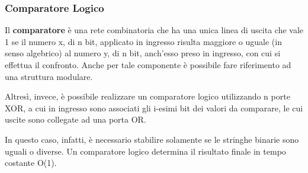\documentclass[12pt]{article}
\begin{document}
\subsubsection{Comparatore Logico}
Il \textbf{comparatore} è una rete combinatoria che ha una unica linea di uscita che vale 1 se il numero x, di n bit, applicato in ingresso risulta maggiore o uguale (in senso algebrico) al numero y, di n bit, anch’esso preso in ingresso, con cui si effettua il confronto.
Anche per tale componente è possibile fare riferimento ad una struttura modulare. \par\medskip\noindent
Altresì, invece, è possibile realizzare un comparatore logico utilizzando n porte XOR, a cui in ingresso sono associati gli i-esimi bit dei valori da comparare, le cui uscite sono collegate ad una porta OR.\par\medskip\noindent
In questo caso, infatti, è necessario stabilire solamente se le stringhe binarie sono uguali o diverse. Un comparatore logico determina il risultato finale in tempo costante O(1).
\end{document}
